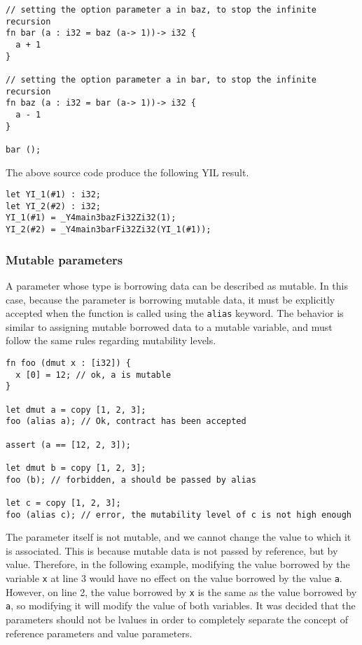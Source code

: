 \begin{lstlisting}[style=coloredverbatim]
// setting the option parameter a in baz, to stop the infinite recursion
fn bar (a : i32 = baz (a-> 1))-> i32 {
  a + 1
}

// setting the option parameter a in bar, to stop the infinite recursion
fn baz (a : i32 = bar (a-> 1))-> i32 {
  a - 1
}

bar ();
\end{lstlisting}

The above source code produce the following YIL result.

\begin{lstlisting}[style=intermediateVerb]
let YI_1(#1) : i32;
let YI_2(#2) : i32;
YI_1(#1) = _Y4main3bazFi32Zi32(1);
YI_2(#2) = _Y4main3barFi32Zi32(YI_1(#1));
\end{lstlisting}


\subsubsection {Mutable parameters}

A parameter whose type is borrowing data can be described as mutable. In this
case, because the parameter is borrowing mutable data, it must be explicitly
accepted when the function is called using the \texttt{alias} keyword. The
behavior is similar to assigning mutable borrowed data to a mutable variable,
and must follow the same rules regarding mutability levels.

\begin{lstlisting}[style=coloredverbatim]
fn foo (dmut x : [i32]) {
  x [0] = 12; // ok, a is mutable
}

let dmut a = copy [1, 2, 3];
foo (alias a); // Ok, contract has been accepted

assert (a == [12, 2, 3]);

let dmut b = copy [1, 2, 3];
foo (b); // forbidden, a should be passed by alias

let c = copy [1, 2, 3];
foo (alias c); // error, the mutability level of c is not high enough
\end{lstlisting}

The parameter itself is not mutable, and we cannot change the value to which it
is associated. This is because mutable data is not passed by reference, but by
value. Therefore, in the following example, modifying the value borrowed by the
variable \texttt{x} at line 3 would have no effect on the value borrowed by the
value \texttt{a}. However, on line 2, the value borrowed by \texttt{x} is the
same as the value borrowed by \texttt{a}, so modifying it will modify the value
of both variables. It was decided that the parameters should not be lvalues in
order to completely separate the concept of reference parameters and value
parameters.

